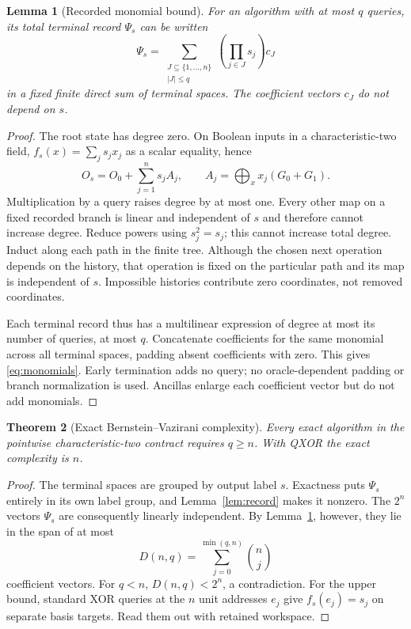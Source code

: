 \documentclass[11pt]{article}
\newtheorem{theorem}{Theorem}[section]
\newtheorem{lemma}[theorem]{Lemma}
\begin{document}
\begin{lemma}[Recorded monomial bound]\label{lem:degree}
For an algorithm with at most $q$ queries, its total terminal record $\Psi_s$ can be written
\begin{equation}\label{eq:monomials}
 \Psi_s=\sum_{\substack{J\subseteq\{1,\ldots,n\}\\|J|\le q}}
       \left(\prod_{j\in J}s_j\right)c_J
\end{equation}
in a fixed finite direct sum of terminal spaces. The coefficient vectors $c_J$ do not depend on $s$.
\end{lemma}
\begin{proof}
The root state has degree zero. On Boolean inputs in a characteristic-two field, $f_s(x)=\sum_js_jx_j$ as a scalar equality, hence
\[
 O_s=O_0+\sum_{j=1}^n s_j A_j,
 \qquad A_j=\bigoplus_x x_j(G_0+G_1).
\]
Multiplication by a query raises degree by at most one. Every other map on a fixed recorded branch is linear and independent of $s$ and therefore cannot increase degree. Reduce powers using $s_j^2=s_j$; this cannot increase total degree. Induct along each path in the finite tree. Although the chosen next operation depends on the history, that operation is fixed on the particular path and its map is independent of $s$. Impossible histories contribute zero coordinates, not removed coordinates.

Each terminal record thus has a multilinear expression of degree at most its number of queries, at most $q$. Concatenate coefficients for the same monomial across all terminal spaces, padding absent coefficients with zero. This gives \eqref{eq:monomials}. Early termination adds no query; no oracle-dependent padding or branch normalization is used. Ancillas enlarge each coefficient vector but do not add monomials.
\end{proof}

\begin{theorem}[Exact Bernstein--Vazirani complexity]\label{thm:bv}
Every exact algorithm in the pointwise characteristic-two contract requires $q\ge n$. With QXOR the exact complexity is $n$.
\end{theorem}
\begin{proof}
The terminal spaces are grouped by output label $s$. Exactness puts $\Psi_s$ entirely in its own label group, and Lemma~\ref{lem:record} makes it nonzero. The $2^n$ vectors $\Psi_s$ are consequently linearly independent. By Lemma~\ref{lem:degree}, however, they lie in the span of at most
\[
 D(n,q)=\sum_{j=0}^{\min(q,n)}\binom nj
\]
coefficient vectors. For $q<n$, $D(n,q)<2^n$, a contradiction. For the upper bound, standard XOR queries at the $n$ unit addresses $e_j$ give $f_s(e_j)=s_j$ on separate basis targets. Read them out with retained workspace.
\end{proof}
\end{document}
